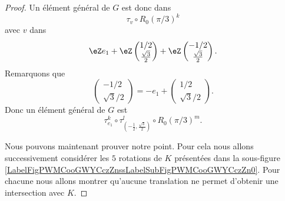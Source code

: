 \begin{proof}
    Un élément général de \( G\) est donc dans
    \begin{equation}
        \tau_v\circ R_0(\pi/3)^k
    \end{equation}
    avec \( v\) dans
    \begin{equation}
        \eZ e_1+\eZ\begin{pmatrix}
            1/2    \\ 
            \frac{ \sqrt{ 3 } }{2}    
        \end{pmatrix}
        +\eZ\begin{pmatrix}
            -1/2    \\ 
            \frac{ \sqrt{ 3 } }{2}    
        \end{pmatrix}.
    \end{equation}
    Remarquons que
    \begin{equation}
        \begin{pmatrix}
            -1/2    \\ 
            \sqrt{ 3 }/2
        \end{pmatrix}=-e_1+\begin{pmatrix}
            1/2    \\ 
            \sqrt{ 3 }/2    
        \end{pmatrix}.
    \end{equation}
    Donc un élément général de \( G\) est 
    \begin{equation}
        \tau_{e_1}^k\circ \tau_{(-\frac{ 1 }{2},\frac{ \sqrt{ 3 } }{2})}^l\circ R_0(\pi/3)^m.
    \end{equation}
    
    Nous pouvons maintenant prouver notre point. Pour cela nous allons successivement considérer les \( 5\) rotations de \( K \) présentées dans la sous-figure \ref{LabelFigPWMCooGWYCczZnssLabelSubFigPWMCooGWYCczZn0}. Pour chacune nous allons montrer qu'aucune translation ne permet d'obtenir une intersection avec \( K\).


\end{proof}
